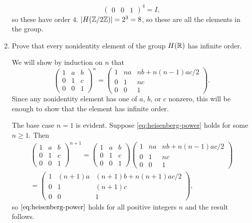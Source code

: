 \begin{enumerate}
\begin{solution}
\begin{equation*}
\begin{pmatrix}
        0 & 0 & 1
      \end{pmatrix}^4
      = I,
    \end{equation*}
    so these have order $4$. $\lvert{H(\mathbb{Z}/2\mathbb{Z})}\rvert = 2^3 = 8$, so these are
    all the elements in the group.
  \end{solution}
\item Prove that every nonidentity element of the group $H(\mathbb{R})$ has
  infinite order.
  \begin{solution}
    We will show by induction on $n$ that
    \begin{equation}
      \label{eq:heisenberg-power}
      \begin{pmatrix}
        1 & a & b \\
        0 & 1 & c \\
        0 & 0 & 1
      \end{pmatrix}^n
      =
      \begin{pmatrix}
        1 & na & nb + n(n-1)ac/2 \\
        0 & 1 & nc \\
        0 & 0 & 1
      \end{pmatrix}.
    \end{equation}
    Since any nonidentity element has one of $a$, $b$, or $c$ nonzero,
    this will be enough to show that the element has infinite order.

    The base case $n = 1$ is evident. Suppose
    \eqref{eq:heisenberg-power} holds for some $n\geq 1$. Then
    \begin{multline*}
      \begin{pmatrix}
        1 & a & b \\
        0 & 1 & c \\
        0 & 0 & 1
      \end{pmatrix}^{n+1}
      =
      \begin{pmatrix}
        1 & a & b \\
        0 & 1 & c \\
        0 & 0 & 1
      \end{pmatrix}
      \begin{pmatrix}
        1 & na & nb + n(n-1)ac/2 \\
        0 & 1 & nc \\
        0 & 0 & 1
      \end{pmatrix} \\
      =
      \begin{pmatrix}
        1 & (n+1)a & (n+1)b + n(n+1)ac/2 \\
        0 & 1 & (n+1)c \\
        0 & 0 & 1
      \end{pmatrix},
    \end{multline*}
    so $\eqref{eq:heisenberg-power}$ holds for all positive integers
    $n$ and the result follows.
  \end{solution}
\end{enumerate}
